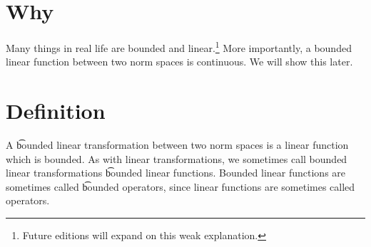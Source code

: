 
\section*{Why}

Many things in real life are bounded and linear.\footnote{Future editions will expand on this weak explanation.}
More importantly, a bounded linear function between two norm spaces is continuous.
We will show this later.

\section*{Definition}

A \t{bounded linear transformation} between two norm spaces is a linear function which is bounded.
As with linear transformations, we sometimes call bounded linear transformations \t{bounded linear functions}.
Bounded linear functions are sometimes called \t{bounded operators}, since linear functions are sometimes called operators.

\blankpage